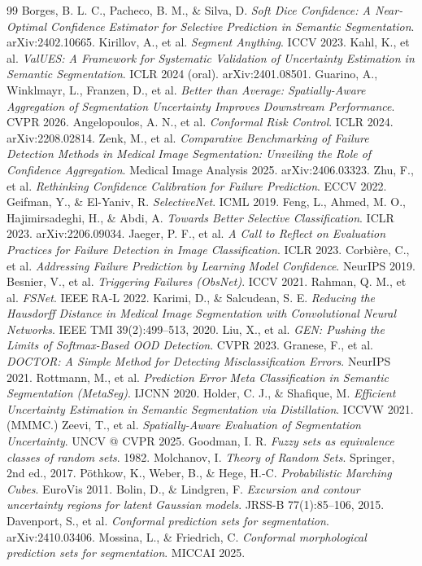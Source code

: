 \documentclass[11pt]{article}
\theoremstyle{remark}
\begin{document}
\begin{thebibliography}{99}
\small
{} Borges, B. L. C., Pacheco, B. M., \& Silva, D. \emph{Soft Dice
Confidence: A Near-Optimal Confidence Estimator for Selective Prediction in Semantic
Segmentation}. arXiv:2402.10665.
 Kirillov, A., et al. \emph{Segment Anything}. ICCV 2023.
 Kahl, K., et al. \emph{ValUES: A Framework for Systematic Validation
of Uncertainty Estimation in Semantic Segmentation}. ICLR 2024 (oral).
arXiv:2401.08501.
 Guarino, A., Winklmayr, L., Franzen, D., et al. \emph{Better than
Average: Spatially-Aware Aggregation of Segmentation Uncertainty Improves Downstream
Performance}. CVPR 2026.
 Angelopoulos, A. N., et al. \emph{Conformal Risk Control}. ICLR 2024.
arXiv:2208.02814.
 Zenk, M., et al. \emph{Comparative Benchmarking of Failure Detection
Methods in Medical Image Segmentation: Unveiling the Role of Confidence Aggregation}.
Medical Image Analysis 2025. arXiv:2406.03323.
 Zhu, F., et al. \emph{Rethinking Confidence Calibration for Failure
Prediction}. ECCV 2022.
 Geifman, Y., \& El-Yaniv, R. \emph{SelectiveNet}. ICML 2019.
 Feng, L., Ahmed, M. O., Hajimirsadeghi, H., \& Abdi, A. \emph{Towards
Better Selective Classification}. ICLR 2023. arXiv:2206.09034.
 Jaeger, P. F., et al. \emph{A Call to Reflect on Evaluation
Practices for Failure Detection in Image Classification}. ICLR 2023.
 Corbi\`ere, C., et al. \emph{Addressing Failure Prediction by
Learning Model Confidence}. NeurIPS 2019.
 Besnier, V., et al. \emph{Triggering Failures (ObsNet)}. ICCV 2021.
 Rahman, Q. M., et al. \emph{FSNet}. IEEE RA-L 2022.
 Karimi, D., \& Salcudean, S. E. \emph{Reducing the Hausdorff
Distance in Medical Image Segmentation with Convolutional Neural Networks}. IEEE TMI
39(2):499--513, 2020.
 Liu, X., et al. \emph{GEN: Pushing the Limits of Softmax-Based OOD
Detection}. CVPR 2023.
 Granese, F., et al. \emph{DOCTOR: A Simple Method for Detecting
Misclassification Errors}. NeurIPS 2021.
 Rottmann, M., et al. \emph{Prediction Error Meta Classification in
Semantic Segmentation (MetaSeg)}. IJCNN 2020.
 Holder, C. J., \& Shafique, M. \emph{Efficient Uncertainty
Estimation in Semantic Segmentation via Distillation}. ICCVW 2021. (MMMC.)
 Zeevi, T., et al. \emph{Spatially-Aware Evaluation of Segmentation
Uncertainty}. UNCV @ CVPR 2025.
 Goodman, I. R. \emph{Fuzzy sets as equivalence classes of random
sets}. 1982.
 Molchanov, I. \emph{Theory of Random Sets}. Springer, 2nd ed.,
2017.
 P\"othkow, K., Weber, B., \& Hege, H.-C. \emph{Probabilistic
Marching Cubes}. EuroVis 2011.
 Bolin, D., \& Lindgren, F. \emph{Excursion and contour uncertainty
regions for latent Gaussian models}. JRSS-B 77(1):85--106, 2015.
 Davenport, S., et al. \emph{Conformal prediction sets for
segmentation}. arXiv:2410.03406.
 Mossina, L., \& Friedrich, C. \emph{Conformal morphological
prediction sets for segmentation}. MICCAI 2025.
\end{thebibliography}
\end{document}
